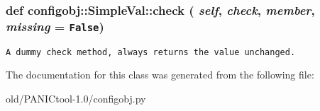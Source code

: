 \subsubsection{\setlength{\rightskip}{0pt plus 5cm}def configobj::Simple\-Val::check ( {\em self},  {\em check},  {\em member},  {\em missing} = {\tt False})}\label{classconfigobj_1_1SimpleVal_e8ade078946d8095b499141f027dcd96}




\footnotesize\begin{verbatim}A dummy check method, always returns the value unchanged.\end{verbatim}
\normalsize
 

The documentation for this class was generated from the following file:\begin{CompactItemize}
\item 
old/PANICtool-1.0/configobj.py\end{CompactItemize}
